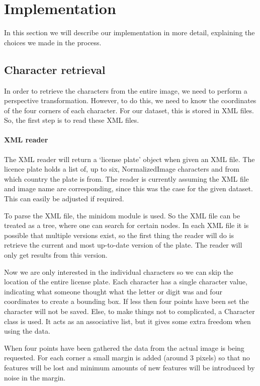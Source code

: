 \documentclass[a4paper]{article}
\begin{document}
\section{Implementation}

In this section we will describe our implementation in more detail, explaining
the choices we made in the process.

\subsection{Character retrieval}

In order to retrieve the characters from the entire image, we need to
perform a perspective transformation. However, to do this, we need to know the
coordinates of the four corners of each character. For our dataset, this is
stored in XML files. So, the first step is to read these XML files.

\paragraph*{XML reader}

The XML reader will return a `license plate' object when given an XML file. The
licence plate holds a list of, up to six, NormalizedImage characters and from
which country the plate is from. The reader is currently assuming the XML file
and image name are corresponding, since this was the case for the given
dataset. This can easily be adjusted if required.

To parse the XML file, the minidom module is used. So the XML file can be
treated as a tree, where one can search for certain nodes. In each XML
file it is possible that multiple versions exist, so the first thing the reader
will do is retrieve the current and most up-to-date version of the plate. The
reader will only get results from this version.

Now we are only interested in the individual characters so we can skip the
location of the entire license plate. Each character has
a single character value, indicating what someone thought what the letter or
digit was and four coordinates to create a bounding box. If less then four
points have been set the character will not be saved. Else, to make things not
to complicated, a Character class is used. It acts as an associative list, but
it gives some extra freedom when using the data.

When four points have been gathered the data from the actual image is being
requested. For each corner a small margin is added (around 3 pixels) so that no
features will be lost and minimum amounts of new features will be introduced by
noise in the margin.
\end{document}
